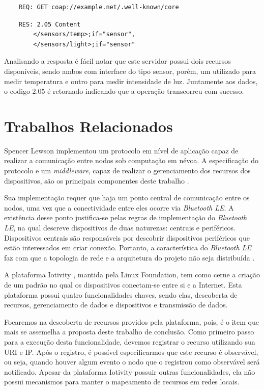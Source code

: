 \begin{verbatim}
    REQ: GET coap://example.net/.well-known/core
\end{verbatim}

\begin{verbatim}
    RES: 2.05 Content
        </sensors/temp>;if="sensor",
        </sensors/light>;if="sensor"
\end{verbatim}


Analisando a resposta é fácil notar que este servidor possui dois recursos disponíveis,
sendo ambos com interface do tipo sensor, porém, um utilizado para medir temperatura e outro para medir intensidade de luz.
Juntamente aos dados, o codigo 2.05 é retornado indicando que a operação transcorreu com sucesso.


\section{Trabalhos Relacionados}


Spencer Lewson implementou um protocolo em nível de aplicação \cite{tanenbaum2011redes} capaz de realizar a comunicação entre nodos sob computação em névoa.
A especificação do protocolo e um \textit{middleware}, capaz de realizar o gerenciamento dos recursos dos dispositivos, são os principais componentes deste trabalho \cite{Spencer:2015}.

Sua implementação requer que haja um ponto central de comunicação entre os nodos, uma vez que a conectividade entre eles ocorre via \textit{Bluetooth LE}.
A existência desse ponto justifica-se pelas regras de implementação do \textit{Bluetooth LE}, na qual descreve dispositivos de duas naturezas: centrais e periféricos.
Dispositivos centrais são responsáveis por descobrir dispositivos periféricos que estão interessados em criar conexão.
Portanto, a característica do \textit{Bluetooth LE} faz com que a topologia de rede e a arquitetura do projeto não seja distribuída \cite{Spencer:2015}.

A plataforma Iotivity \cite{iotivity}, mantida pela Linux Foundation, tem como cerne a criação de um padrão no qual os dispositivos conectam-se entre si e a Internet.
Esta plataforma possui quatro funcionalidades chaves, sendo elas, descoberta de recursos, gerenciamento de dados e dispositivos e transmissão de dados.


Focaremos na descoberta de recursos providos pela plataforma, pois, é o item que mais se assemelha a proposta deste trabalho de conclusão.
Como primeiro passo para a execução desta funcionalidade, devemos registrar o recurso utilizando sua URI e IP.
Após o registro, é possível especificarmos que este recurso é observável, ou seja, quando houver algum evento o nodo que o registrou como observável será notificado.
Apesar da plataforma Iotivity possuir outras funcionalidades, ela não possui mecanismos para manter o mapeamento de recursos em redes locais.

